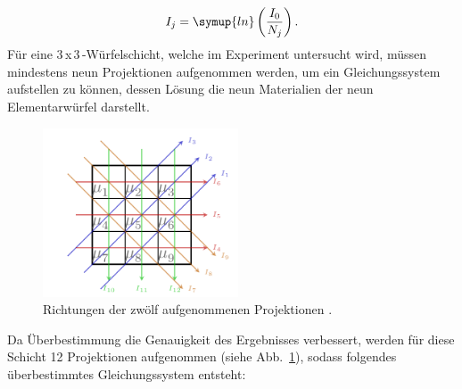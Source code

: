             \begin{align*}
                I_j = \symup{ln}\left(\frac{I_0}{N_j}\right).
            \end{align*}
            Für eine 3\,x\,3\,-Würfelschicht, welche im Experiment untersucht wird, müssen mindestens neun 
            Projektionen aufgenommen werden, um ein Gleichungssystem aufstellen zu können, dessen Lösung 
            die neun Materialien der neun Elementarwürfel darstellt. 
            \begin{figure}
                \centering
                \includegraphics[height=5cm]{wuerfel.png}
                \caption{Richtungen der zwölf aufgenommenen Projektionen \cite{wuerf}.}
                \label{fig:wuerfel}
            \end{figure}
            Da Überbestimmung die Genauigkeit des 
            Ergebnisses verbessert, werden für diese Schicht 12 Projektionen aufgenommen 
            (siehe Abb.~\ref{fig:wuerfel}), sodass folgendes überbestimmtes Gleichungssystem entsteht:

